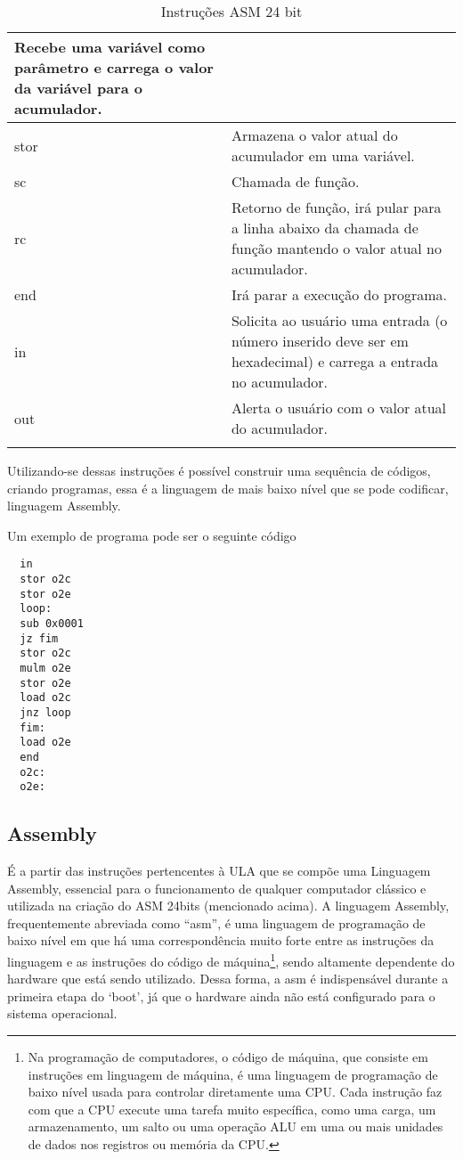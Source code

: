 \begin{longtable}{ |p{3cm}||p{11cm}|  }
  Recebe uma variável como parâmetro e carrega o valor da variável para o acumulador. \\
  \hline
  stor &
  Armazena o valor atual do acumulador em uma variável. \\
  \hline
  sc &
  Chamada de função. \\
  \hline
  rc &
  Retorno de função, irá pular para a linha abaixo da chamada de função mantendo o valor atual no acumulador. \\
  \hline
  end &
  Irá parar a execução do programa. \\
  \hline
  in &
  Solicita ao usuário uma entrada (o número inserido deve ser em hexadecimal) e carrega a entrada no acumulador. \\
  \hline
  out &
  Alerta o usuário com o valor atual do acumulador. \\
  \hline
  \caption{Instruções ASM 24 bit}
  \label{table:2}
\end{longtable}
\vspace{1cm}

Utilizando-se dessas instruções é possível construir uma sequência de códigos, criando programas, essa é a linguagem de mais baixo nível que se pode codificar, linguagem Assembly.

Um exemplo de programa pode ser o seguinte código

\begin{verbatim}
  in
  stor o2c
  stor o2e
  loop:
  sub 0x0001
  jz fim
  stor o2c
  mulm o2e
  stor o2e
  load o2c
  jnz loop
  fim:
  load o2e
  end
  o2c:
  o2e:
\end{verbatim}

\subsection{Assembly}

É a partir das instruções pertencentes à ULA que se compõe uma  Linguagem Assembly, essencial para o funcionamento de qualquer computador clássico e utilizada na criação do ASM 24bits (mencionado acima). A linguagem Assembly, frequentemente abreviada como ``asm'', é uma linguagem de programação de baixo nível em que há uma correspondência muito forte entre as instruções da linguagem e as instruções do código de máquina\footnote{Na programação de computadores, o código de máquina, que consiste em instruções em linguagem de máquina, é uma linguagem de programação de baixo nível usada para controlar diretamente uma CPU. Cada instrução faz com que a CPU execute uma tarefa muito específica, como uma carga, um armazenamento, um salto ou uma operação ALU em uma ou mais unidades de dados nos registros ou memória da CPU.}, sendo altamente dependente do hardware que está sendo utilizado. Dessa forma, a asm é indispensável durante a primeira etapa do `boot', já que o hardware ainda não está configurado para o sistema operacional. 

